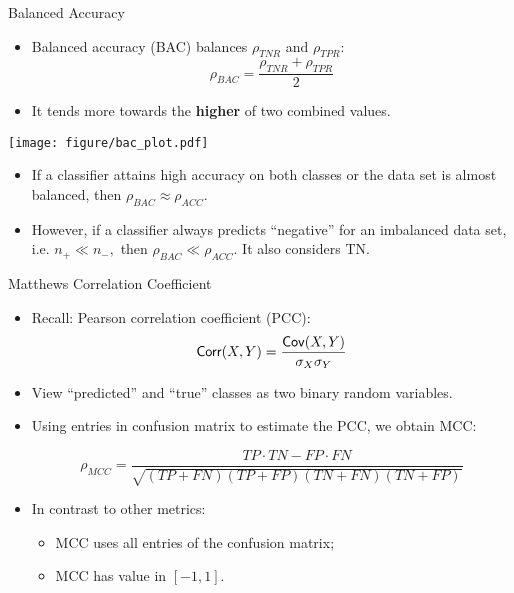 \documentclass[11pt,compress,t,notes=noshow, xcolor=table]{beamer}
\begin{document}
\begin{vbframe}{Balanced Accuracy}
	\footnotesize{
	
    	\begin{minipage}[c]{0.49\textwidth}
    		\begin{itemize}
    			\item Balanced accuracy (BAC) balances $\rho_{TNR}$ and $\rho_{TPR}$: 
    			$$\rho_{BAC} = \frac{\rho_{TNR} + \rho_{TPR}}{2}$$

    			\item  It tends more towards the \textbf{higher} of two combined values.
    		\end{itemize}
    	\end{minipage}
    	\begin{minipage}[c]{0.49\textwidth}
    		\centering
    		\texttt{[image: figure/bac\_plot.pdf]}
    	\end{minipage}

    	\begin{itemize}
    		\item If a classifier attains high accuracy on both classes or the data set is almost balanced, then $\rho_{BAC} \approx \rho_{ACC}$.
            \vspace{20pt}
            
    		\item However, if a classifier always predicts ``negative'' for an imbalanced data set, i.e. $n_+  \ll n_-,$ then $\rho_{BAC} \ll \rho_{ACC}$. It also considers TN.
    
    	\end{itemize}
    }
\end{vbframe}


\begin{vbframe}{Matthews Correlation Coefficient}

	\small{
    	\begin{itemize}
    
            \item Recall: Pearson correlation coefficient (PCC): 
                $$\mathsf{Corr}(X, Y) = \frac{\mathsf{Cov}(X, Y)}{\sigma_{X} \sigma_{Y}}$$
    		\item View ``predicted'' and ``true'' classes as two binary random variables.
      
            \item Using entries in confusion matrix to estimate the PCC, we obtain MCC:
    	
    		$$   \rho_{MCC} = \frac{TP\cdot TN - FP \cdot FN}{\sqrt{(TP+FN)(TP+FP)(TN+FN)(TN+FP)}}$$
    
            \item In contrast to other metrics: 
            \begin{itemize}
                \footnotesize
                \item MCC uses all entries of the confusion matrix;
                \item MCC has value in $[-1,1]$.
            \end{itemize}
    		
        \end{itemize}
    	
	}
\end{vbframe}
\end{document}
